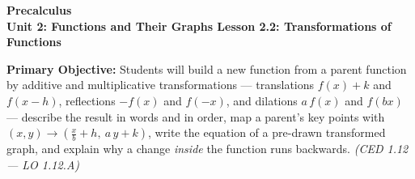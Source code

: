 \documentclass[10pt]{article}
\newcommand{\CourseName}{Precalculus}
\newcommand{\UnitNumberName}{Unit 2: Functions and Their Graphs \quad}
\newcommand{\LessonNumberName}{Lesson 2.2: Transformations of Functions}
\begin{document}
\begin{center}
    {\Large\bfseries \CourseName \\
    {\small\bfseries \UnitNumberName \LessonNumberName}}
\end{center}

\begin{tcolorbox}[colback=lilac, colframe=plum, boxrule=0.9pt, arc=2mm,
    left=2mm, right=2mm, top=1.5mm, bottom=1.5mm]
    \textbf{Primary Objective:} Students will build a new function from a parent function by
    additive and multiplicative transformations --- translations $f(x) + k$ and $f(x - h)$,
    reflections $-f(x)$ and $f(-x)$, and dilations $a\,f(x)$ and $f(bx)$ --- describe the
    result in words and in order, map a parent's key points with
    $(x, y) \to \left(\tfrac{x}{b} + h,\ a\,y + k\right)$, write the equation of a pre-drawn
    transformed graph, and explain why a change \emph{inside} the function runs backwards.
    \hfill\textit{\small (CED 1.12 --- LO 1.12.A)}
\end{tcolorbox}
\end{document}
